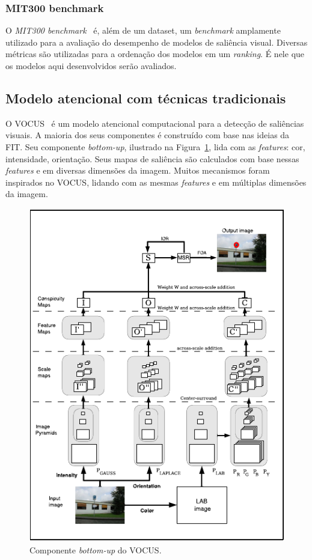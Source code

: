 \documentclass[11pt]{article}
\newcommand{\tit}[1]{\textit{#1}}
\begin{document}
\subsubsection{MIT300 benchmark}
O \tit{MIT300 benchmark}~\cite{mit-300} é, além de um dataset,
um \tit{benchmark} amplamente
utilizado para a avaliação do desempenho de modelos de saliência visual.
Diversas métricas são utilizadas para a ordenação dos modelos em um
\tit{ranking}.
É nele que os modelos aqui desenvolvidos serão avaliados.

\subsection{Modelo atencional com técnicas tradicionais}
O VOCUS~\cite{Frintrop2006} é um modelo atencional computacional
para a detecção de saliências visuais.
A maioria dos seus componentes é construído com base nas ideias da FIT\@.
Seu componente \tit{bottom-up}, ilustrado na Figura~\ref{fig:vocus},
lida com as \tit{features}: cor, intensidade, orientação.
Seus mapas de saliência são calculados com base nessas \tit{features}
e em diversas dimensões da imagem.
Muitos mecanismos foram inspirados no VOCUS, lidando com as mesmas
\tit{features} e em múltiplas dimensões da imagem.

\begin{figure}[H]
\begin{center}
    \includegraphics[width=0.6\linewidth]{img/vocus.png}
\end{center}
\caption{Componente \tit{bottom-up} do VOCUS.}
\label{fig:vocus}
\end{figure}
\end{document}
